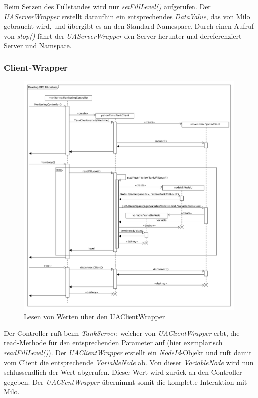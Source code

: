 \documentclass[parskip=full]{scrartcl}
\begin{document}
Beim Setzen des Füllstandes wird nur \emph{setFillLevel()} aufgerufen. Der \emph{UAServerWrapper} erstellt daraufhin
ein entsprechendes \emph{DataValue}, das von Milo gebraucht wird, und übergibt es an den Standard-Namespace.
Durch einen Aufruf von \emph{stop()} fährt der \emph{UAServerWrapper} den Server herunter und dereferenziert
Server und Namspace.

\subsubsection{Client-Wrapper}
\begin{figure}[H]
  \centering
  \includegraphics[scale=0.4]{design/sequence-diagrams/sequence-read-client-value.png}
  \caption{Lesen von Werten über den UAClientWrapper}
\end{figure}
Der Controller ruft beim \emph{TankServer}, welcher von \emph{UAClientWrapper} erbt, die read-Methode für den entsprechenden Parameter auf
(hier exemplarisch \emph{readFillLevel()}). Der \emph{UAClientWrapper} erstellt ein \emph{NodeId}-Objekt und ruft damit
vom Client die entsprechende \emph{VariableNode} ab. Von dieser \emph{VariableNode} wird nun schlussendlich der Wert abgerufen.
Dieser Wert wird zurück an den Controller gegeben. Der \emph{UAClientWrapper} übernimmt somit die
komplette Interaktion mit Milo.
\end{document}
